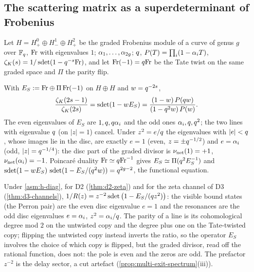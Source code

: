 \subsection{The scattering matrix as a superdeterminant of Frobenius}

Let $H = H^0_+\oplus H^1_-\oplus H^2_+$ be the graded Frobenius module of a curve of genus $g$ over $\mathbb F_q$,
$\mathrm{Fr}$ with eigenvalues $1$; $\alpha_{1},\dots,\alpha_{2g}$; $q$, $P(T) = \prod_i(1-\alpha_{i}T)$, $\zeta_K(s) =
1/\operatorname{sdet}(1-q^{-s}\mathrm{Fr})$, and let $\mathrm{Fr}(-1) = q\mathrm{Fr}$ be the Tate twist on the same graded space and $\Pi$
the parity flip.

\begin{theorem}
\label{thm:scattering-superdeterminant}
With $E_S := \mathrm{Fr}\oplus\Pi\,\mathrm{Fr}(-1)$ on $H\oplus H$ and $w = q^{-2s}$,
\[
\frac{\zeta_K(2s-1)}{\zeta_K(2s)} = \operatorname{sdet}(1-wE_S) = \frac{(1-w)\,P(q w)}{(1-q^2w)\,P(w)} .
\]
The even eigenvalues of $E_S$ are $1,q,q\alpha_{i}$ and the odd ones $\alpha_{i},q,q^2$; the two lines
with eigenvalue $q$ (on $|z| = 1$) cancel. Under $z^2 = e/q$ the eigenvalues with $|e|<q$, whose images lie in the disc,
are exactly $e = 1$ (even, $z = \pm q^{-1/2}$) and $e = \alpha_{i}$ (odd, $|z| = q^{-1/4}$): the disc part of
the graded divisor is $\nu_{\mathrm{net}}(1) = +1$, $\nu_{\mathrm{net}}(\alpha_{i}) = -1$. Poincar\'e duality
$\mathrm{Fr}\simeq q\mathrm{Fr}^{-1}$ gives $E_S\simeq\Pi(q^2E_S^{-1})$ and
$\operatorname{sdet}(1-wE_S)\,\operatorname{sdet}(1-E_S/(q^2w)) = q^{2g-2}$, the functional equation.
\end{theorem}

\begin{proposition}
\label{prop:cavity-superdeterminant}
Under \cref{asm:h-diag}, for D2 (\cref{thm:d2-zeta}) and for the zeta channel of D3 (\cref{thm:d3-channels}),
$1/R(z) = z^{-2}\operatorname{sdet}\big(1-E_S/(q z^2)\big)$: the visible bound states (the Perron pair) are the even disc
eigenvalue $e = 1$ and the resonances are the odd disc eigenvalues $e = \alpha_{i}$, $z^2 = \alpha_{i}/q$. The
parity of a line is its cohomological degree mod $2$ on the untwisted copy and the degree plus one on the
Tate-twisted copy; flipping the untwisted copy instead inverts the ratio, so the operator $E_S$ involves the choice
of which copy is flipped, but the graded divisor, read off the rational function, does not: the pole is even and the
zeros are odd. The prefactor $z^{-2}$ is the delay sector, a cut artefact (\cref{prop:multi-exit-spectrum}(iii)).
\end{proposition}

